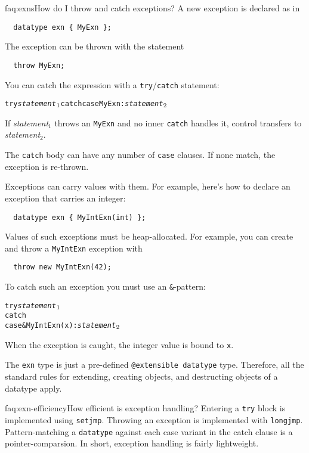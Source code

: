 \begin{faqa}{faq:exns}{How do I throw and catch exceptions?}
A new exception is declared as in 
\begin{verbatim}
  datatype exn { MyExn };
\end{verbatim}
The exception can be thrown with the statement
\begin{verbatim}
  throw MyExn;
\end{verbatim}
You can catch the expression with a \texttt{try}/\texttt{catch}
statement:
\begin{alltt}
  try {\it statement}\(\sb{1}\) catch \lb case MyExn: {\it statement}\(\sb{2}\) \rb
\end{alltt}
If {\it statement}$_1$ throws an \texttt{MyExn} and no inner
\texttt{catch} handles it, control transfers to 
{\it statement}$_2$.

The \texttt{catch} body can have any number of \texttt{case} clauses.
If none match, the exception is re-thrown.

Exceptions can carry values with them.  For example, here's how to
declare an exception that carries an integer:
\begin{verbatim}
  datatype exn { MyIntExn(int) };
\end{verbatim}
Values of such exceptions must be heap-allocated.  For example, you
can create and throw a \texttt{MyIntExn} exception with
\begin{verbatim}
  throw new MyIntExn(42);
\end{verbatim}
To catch such an exception you must use an \texttt{\&}-pattern:
\begin{alltt}
  try {\it statement}\(\sb{1}\)
  catch \lb
    case &MyIntExn(x): {\it statement}\(\sb{2}\)
  \rb
\end{alltt}
When the exception is caught, the integer value is bound to \texttt{x}.

The \texttt{exn} type is just a pre-defined \texttt{@extensible
datatype} type.  Therefore, all the standard rules for extending,
creating objects, and destructing objects of a datatype apply.
\end{faqa}

\begin{faqa}{faq:exn-efficiency}{How efficient is exception handling?}
Entering a \texttt{try} block is implemented using \texttt{setjmp}.
Throwing an exception is implemented with \texttt{longjmp}.
Pattern-matching a \texttt{datatype} against each case variant in the
catch clause is a pointer-comparsion.  In short, exception handling is
fairly lightweight.
\end{faqa}

